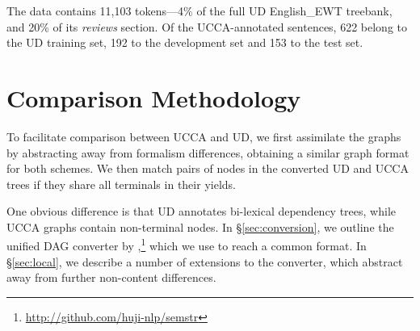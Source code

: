 \documentclass[11pt,a4paper]{article}
\newcommand{\daniel}[1]{\footnote{\color{blue}DH: #1}}
\begin{document}
The data contains 11,103 tokens---4\% of the full UD English\_EWT treebank,
and 20\% of its \textit{reviews} section.
Of the UCCA-annotated sentences, 622 belong to the UD training set,
192 to the development set and 153 to the test set.


\section{Comparison Methodology}\label{sec:methodology}

To facilitate comparison between UCCA and UD,
we first assimilate the graphs by abstracting away from formalism differences,
obtaining a similar graph format for both schemes.
We then match pairs of nodes in the converted UD and UCCA trees
if they share all terminals in their yields.

One obvious difference is that UD annotates bi-lexical dependency trees,
while UCCA graphs contain non-terminal nodes.
In \S\ref{sec:conversion}, we outline the unified DAG converter by
\citet{hershcovich2018multitask,hershcovich2018universal},\footnote{\url{http://github.com/huji-nlp/semstr}}
which we use to reach a common format.
In \S\ref{sec:local}, we describe a number of extensions
to the converter, which abstract away from further non-content differences.
\end{document}
